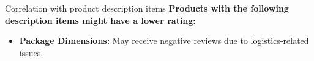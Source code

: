 \begin{frame}{Correlation with product description items}
	\footnotesize
	\textbf{Products with the following description items might have a lower rating:}
	\scriptsize
	\begin{itemize}
		\item \textbf{Package Dimensions:} May receive negative reviews due to logistics-related issues.
	\end{itemize}
	\normalsize

\end{frame}








